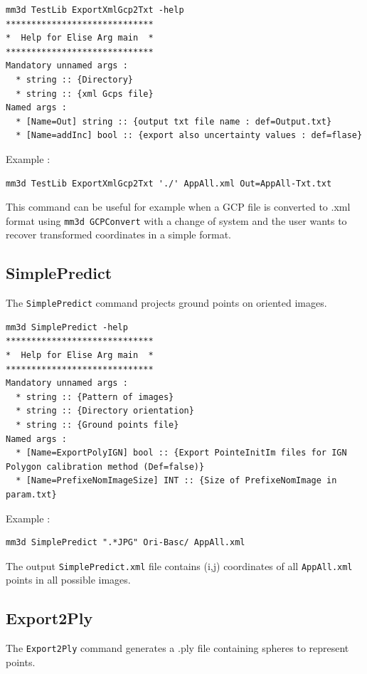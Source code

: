 \begin{verbatim}
mm3d TestLib ExportXmlGcp2Txt -help
*****************************
*  Help for Elise Arg main  *
*****************************
Mandatory unnamed args : 
  * string :: {Directory}
  * string :: {xml Gcps file}
Named args : 
  * [Name=Out] string :: {output txt file name : def=Output.txt}
  * [Name=addInc] bool :: {export also uncertainty values : def=flase}
\end{verbatim}

Example :
\begin{verbatim}
mm3d TestLib ExportXmlGcp2Txt './' AppAll.xml Out=AppAll-Txt.txt
\end{verbatim}

This command can be useful for example when a GCP file is converted to .xml format using {\tt mm3d GCPConvert} with a change of system and the user wants to recover transformed coordinates in a simple format.


\subsection{SimplePredict}
The {\tt SimplePredict} command projects ground points on oriented images.

\begin{verbatim}
mm3d SimplePredict -help
*****************************
*  Help for Elise Arg main  *
*****************************
Mandatory unnamed args : 
  * string :: {Pattern of images}
  * string :: {Directory orientation}
  * string :: {Ground points file}
Named args : 
  * [Name=ExportPolyIGN] bool :: {Export PointeInitIm files for IGN Polygon calibration method (Def=false)}
  * [Name=PrefixeNomImageSize] INT :: {Size of PrefixeNomImage in param.txt}
\end{verbatim}

Example :
\begin{verbatim}
mm3d SimplePredict ".*JPG" Ori-Basc/ AppAll.xml
\end{verbatim}

The output {\tt SimplePredict.xml} file contains (i,j) coordinates of all {\tt AppAll.xml} points in all possible images.

\subsection{Export2Ply}
The {\tt Export2Ply} command generates a .ply file containing spheres to represent points.

